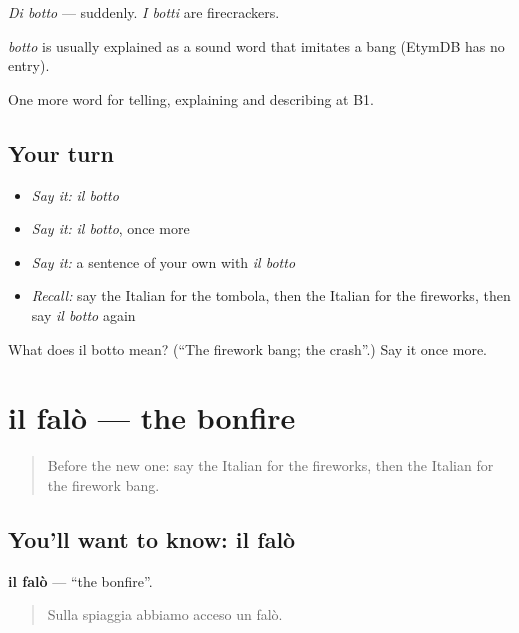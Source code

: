 \emph{Di botto} — suddenly. \emph{I botti} are firecrackers.

\begin{cousinweb}
\emph{botto} is usually explained as a sound word that imitates a bang (EtymDB has no entry).
\end{cousinweb}

\begin{grammarlens}[title={What you've built}]
One more word for telling, explaining and describing at B1.
\end{grammarlens}

\subsection*{Your turn}
\begin{itemize}
\raggedright
  \item \emph{Say it:} \emph{il botto}
  \item \emph{Say it:} \emph{il botto}, once more
  \item \emph{Say it:} a sentence of your own with \emph{il botto}
  \item \emph{Recall:} say the Italian for the tombola, then the Italian for the fireworks, then say \emph{il botto} again
\end{itemize}

\begin{tcolorbox}[breakable,colback=teal!4,colframe=teal!35!black,title={Before you move on}]
What does il botto mean? (\textquotedblleft{}The firework bang; the crash\textquotedblright{}.) Say it once more.
\end{tcolorbox}
\section[il falò]{il falò — the bonfire}

\label{lesson:IT-C322-falo}



\begin{quote}
Before the new one: say the Italian for the fireworks, then the Italian for the firework bang.
\end{quote}

\subsection*{You'll want to know: il falò}
\textbf{il falò} — \textquotedblleft{}the bonfire\textquotedblright{}.

\begin{quote}
Sulla spiaggia abbiamo acceso un falò.
\end{quote}

